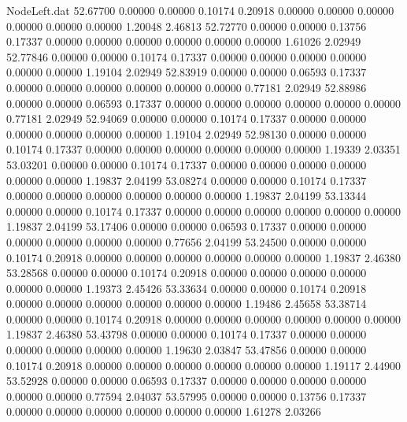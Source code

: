 \begin{filecontents}{NodeLeft.dat}
  52.67700    0.00000    0.00000     0.10174    0.20918    0.00000    0.00000    0.00000    0.00000    0.00000    0.00000    1.20048    2.46813
  52.72770    0.00000    0.00000     0.13756    0.17337    0.00000    0.00000    0.00000    0.00000    0.00000    0.00000    1.61026    2.02949
  52.77846    0.00000    0.00000     0.10174    0.17337    0.00000    0.00000    0.00000    0.00000    0.00000    0.00000    1.19104    2.02949
  52.83919    0.00000    0.00000     0.06593    0.17337    0.00000    0.00000    0.00000    0.00000    0.00000    0.00000    0.77181    2.02949
  52.88986    0.00000    0.00000     0.06593    0.17337    0.00000    0.00000    0.00000    0.00000    0.00000    0.00000    0.77181    2.02949
  52.94069    0.00000    0.00000     0.10174    0.17337    0.00000    0.00000    0.00000    0.00000    0.00000    0.00000    1.19104    2.02949
  52.98130    0.00000    0.00000     0.10174    0.17337    0.00000    0.00000    0.00000    0.00000    0.00000    0.00000    1.19339    2.03351
  53.03201    0.00000    0.00000     0.10174    0.17337    0.00000    0.00000    0.00000    0.00000    0.00000    0.00000    1.19837    2.04199
  53.08274    0.00000    0.00000     0.10174    0.17337    0.00000    0.00000    0.00000    0.00000    0.00000    0.00000    1.19837    2.04199
  53.13344    0.00000    0.00000     0.10174    0.17337    0.00000    0.00000    0.00000    0.00000    0.00000    0.00000    1.19837    2.04199
  53.17406    0.00000    0.00000     0.06593    0.17337    0.00000    0.00000    0.00000    0.00000    0.00000    0.00000    0.77656    2.04199
  53.24500    0.00000    0.00000     0.10174    0.20918    0.00000    0.00000    0.00000    0.00000    0.00000    0.00000    1.19837    2.46380
  53.28568    0.00000    0.00000     0.10174    0.20918    0.00000    0.00000    0.00000    0.00000    0.00000    0.00000    1.19373    2.45426
  53.33634    0.00000    0.00000     0.10174    0.20918    0.00000    0.00000    0.00000    0.00000    0.00000    0.00000    1.19486    2.45658
  53.38714    0.00000    0.00000     0.10174    0.20918    0.00000    0.00000    0.00000    0.00000    0.00000    0.00000    1.19837    2.46380
  53.43798    0.00000    0.00000     0.10174    0.17337    0.00000    0.00000    0.00000    0.00000    0.00000    0.00000    1.19630    2.03847
  53.47856    0.00000    0.00000     0.10174    0.20918    0.00000    0.00000    0.00000    0.00000    0.00000    0.00000    1.19117    2.44900
  53.52928    0.00000    0.00000     0.06593    0.17337    0.00000    0.00000    0.00000    0.00000    0.00000    0.00000    0.77594    2.04037
  53.57995    0.00000    0.00000     0.13756    0.17337    0.00000    0.00000    0.00000    0.00000    0.00000    0.00000    1.61278    2.03266

\end{filecontents}
